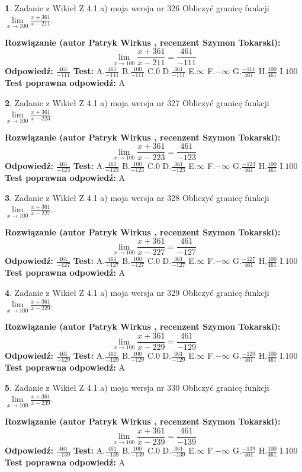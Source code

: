 \documentclass[12pt, a4paper]{article}
\theoremstyle{definition} %
\newtheorem{zad}{}
\newcommand{\zadStart}[1]{\begin{zad}#1\newline}
\newcommand{\zadStop}{\end{zad}}
\newcommand{\rozwStart}[2]{\noindent \textbf{Rozwiązanie (autor #1 , recenzent #2): }\newline}
\newcommand{\rozwStop}{\newline}
\newcommand{\odpStart}{\noindent \textbf{Odpowiedź:}\newline}
\newcommand{\odpStop}{\newline}
\newcommand{\testStart}{\noindent \textbf{Test:}\newline}
\newcommand{\testStop}{\newline}
\newcommand{\kluczStart}{\noindent \textbf{Test poprawna odpowiedź:}\newline}
\newcommand{\kluczStop}{\newline}
\begin{document}
\zadStart{Zadanie z Wikieł Z 4.1 a) moja wersja nr 326}
Obliczyć granicę funkcji $\lim\limits_{x\to100}\frac{x+361}{x-211}$.
\zadStop
\rozwStart{Patryk Wirkus}{Szymon Tokarski}
$$\lim\limits_{x\to100}\frac{x+361}{x-211} = \frac{461}{-111}$$
\rozwStop
\odpStart
$\frac{461}{-111}$
\odpStop
\testStart
A.$\frac{461}{-111}$
B.$\frac{100}{-111}$
C.$0$
D.$\frac{361}{-111}$
E.$\infty$
F.$-\infty$
G.$\frac{-111}{461}$
H.$\frac{100}{461}$
I.$100$
\testStop
\kluczStart
A
\kluczStop



\zadStart{Zadanie z Wikieł Z 4.1 a) moja wersja nr 327}
Obliczyć granicę funkcji $\lim\limits_{x\to100}\frac{x+361}{x-223}$.
\zadStop
\rozwStart{Patryk Wirkus}{Szymon Tokarski}
$$\lim\limits_{x\to100}\frac{x+361}{x-223} = \frac{461}{-123}$$
\rozwStop
\odpStart
$\frac{461}{-123}$
\odpStop
\testStart
A.$\frac{461}{-123}$
B.$\frac{100}{-123}$
C.$0$
D.$\frac{361}{-123}$
E.$\infty$
F.$-\infty$
G.$\frac{-123}{461}$
H.$\frac{100}{461}$
I.$100$
\testStop
\kluczStart
A
\kluczStop



\zadStart{Zadanie z Wikieł Z 4.1 a) moja wersja nr 328}
Obliczyć granicę funkcji $\lim\limits_{x\to100}\frac{x+361}{x-227}$.
\zadStop
\rozwStart{Patryk Wirkus}{Szymon Tokarski}
$$\lim\limits_{x\to100}\frac{x+361}{x-227} = \frac{461}{-127}$$
\rozwStop
\odpStart
$\frac{461}{-127}$
\odpStop
\testStart
A.$\frac{461}{-127}$
B.$\frac{100}{-127}$
C.$0$
D.$\frac{361}{-127}$
E.$\infty$
F.$-\infty$
G.$\frac{-127}{461}$
H.$\frac{100}{461}$
I.$100$
\testStop
\kluczStart
A
\kluczStop



\zadStart{Zadanie z Wikieł Z 4.1 a) moja wersja nr 329}
Obliczyć granicę funkcji $\lim\limits_{x\to100}\frac{x+361}{x-229}$.
\zadStop
\rozwStart{Patryk Wirkus}{Szymon Tokarski}
$$\lim\limits_{x\to100}\frac{x+361}{x-229} = \frac{461}{-129}$$
\rozwStop
\odpStart
$\frac{461}{-129}$
\odpStop
\testStart
A.$\frac{461}{-129}$
B.$\frac{100}{-129}$
C.$0$
D.$\frac{361}{-129}$
E.$\infty$
F.$-\infty$
G.$\frac{-129}{461}$
H.$\frac{100}{461}$
I.$100$
\testStop
\kluczStart
A
\kluczStop



\zadStart{Zadanie z Wikieł Z 4.1 a) moja wersja nr 330}
Obliczyć granicę funkcji $\lim\limits_{x\to100}\frac{x+361}{x-239}$.
\zadStop
\rozwStart{Patryk Wirkus}{Szymon Tokarski}
$$\lim\limits_{x\to100}\frac{x+361}{x-239} = \frac{461}{-139}$$
\rozwStop
\odpStart
$\frac{461}{-139}$
\odpStop
\testStart
A.$\frac{461}{-139}$
B.$\frac{100}{-139}$
C.$0$
D.$\frac{361}{-139}$
E.$\infty$
F.$-\infty$
G.$\frac{-139}{461}$
H.$\frac{100}{461}$
I.$100$
\testStop
\kluczStart
A
\kluczStop
\end{document}
